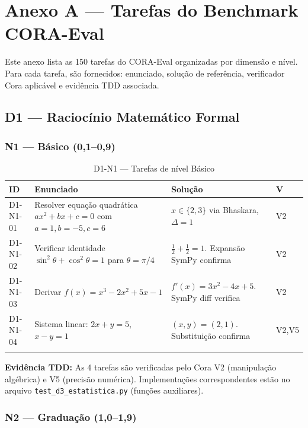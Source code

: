 \documentclass[12pt,a4paper,oneside]{article}
\begin{document}
\newpage
\appendix

\section{Anexo A — Tarefas do Benchmark CORA-Eval}

Este anexo lista as 150 tarefas do CORA-Eval organizadas por dimensão e nível.
Para cada tarefa, são fornecidos: enunciado, solução de referência, verificador
Cora aplicável e evidência TDD associada.

\subsection{D1 — Raciocínio Matemático Formal}

\subsubsection{N1 — Básico (0,1--0,9)}

\begin{longtable}{p{}p{}p{}p{}}
\toprule
\textbf{ID} & \textbf{Enunciado} & \textbf{Solução} & \textbf{V} \\
\midrule
D1-N1-01 & Resolver equação quadrática $ax^2+bx+c=0$ com $a=1,b=-5,c=6$ & $x\in\{2,3\}$ via Bhaskara, $\Delta=1$ & V2 \\
D1-N1-02 & Verificar identidade $\sin^2\theta+\cos^2\theta=1$ para $\theta=\pi/4$ & $\frac{1}{2}+\frac{1}{2}=1$. Expansão SymPy confirma & V2 \\
D1-N1-03 & Derivar $f(x)=x^3-2x^2+5x-1$ & $f'(x)=3x^2-4x+5$. SymPy diff verifica & V2 \\
D1-N1-04 & Sistema linear: $2x+y=5$, $x-y=1$ & $(x,y)=(2,1)$. Substituição confirma & V2,V5 \\
\bottomrule
\caption{D1-N1 — Tarefas de nível Básico}
\end{longtable}

\textbf{Evidência TDD:} As 4 tarefas são verificadas pelo Cora V2 (manipulação
algébrica) e V5 (precisão numérica). Implementações correspondentes estão no
arquivo \texttt{test\_d3\_estatistica.py} (funções auxiliares).

\subsubsection{N2 — Graduação (1,0--1,9)}
\end{document}
